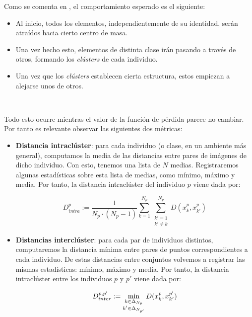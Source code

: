 Como se comenta en \cite{informatica:paper_cacd}, el comportamiento esperado es el siguiente:

\begin{itemize}
    \item Al inicio, todos los elementos, independientemente de su identidad, serán atraídos hacia cierto centro de masa.
    \item Una vez hecho esto, elementos de distinta clase irán pasando a través de otros, formando los \textit{clústers} de cada individuo.
    \item Una vez que los \textit{clústers} establecen cierta estructura, estos empiezan a alejarse unos de otros.
\end{itemize}\

Todo esto ocurre mientras el valor de la función de pérdida parece no cambiar. Por tanto es relevante observar las siguientes dos métricas:

\begin{itemize}
    \item \textbf{Distancia intraclúster}: para cada individuo (o clase, en un ambiente más general), computamos la media de las distancias entre pares de imágenes de dicho individuo. Con esto, tenemos una lista de $N$ medias. Registraremos algunas estadísticas sobre esta lista de medias, como mínimo, máximo y media. Por tanto, la distancia intraclúster del individuo $p$ viene dada por:

    \begin{equation}
        D_{intra}^p := \frac{1}{N_p \cdot (N_p - 1)} \sum_{k = 1}^{N_p} \sum_{\substack{k' = 1 \\ k' \neq k}}^{N_p} D(x_k^p, x_{k'}^p)
    \end{equation}

    \item \textbf{Distancias interclúster}: para cada par de individuos distintos, computaremos la distancia mínima entre pares de puntos correspondientes a cada individuo. De estas distancias entre conjuntos volvemos a registrar las mismas estadísticas: mínimo, máximo y media. Por tanto, la distancia intraclúster entre los individuos $p$ y $p'$ viene dada por:

    \begin{equation}
        D_{inter}^{p, p'} := \min_{\substack{k \in \Delta_{N_p} \\ k' \in \Delta_{N_{p'}}}}{D(x_k^p, x_{k'}^{p'})}
    \end{equation}
\end{itemize}

